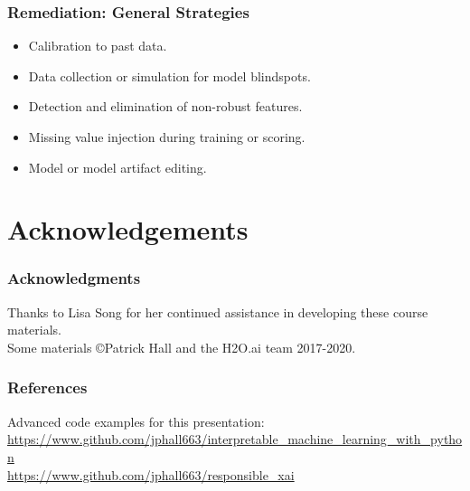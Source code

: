 \documentclass[11pt,
               aspectratio=169,
               hyperref={colorlinks}
               ]{beamer}
\begin{document}
			\begin{frame}
		
				\frametitle{\textbf{Remediation}: General Strategies}

				\begin{itemize}
					\item Calibration to past data.
					\item Data collection or simulation for model blindspots.
					\item Detection and elimination of non-robust features.
					\item Missing value injection during training or scoring.
					\item Model or model artifact editing.
				\end{itemize}				
				
			\end{frame}



	\section{Acknowledgements} 

		\begin{frame}
			
			\frametitle{Acknowledgments}
			
				Thanks to Lisa Song for her continued assistance in developing these course materials.\\
				\vspace{10pt}
				Some materials \copyright\hspace{1pt}Patrick Hall and the H2O.ai team 2017-2020.  
			
		\end{frame}	

		\begin{frame}[t, allowframebreaks]
	
			\frametitle{References}	

			Advanced code examples for this presentation:\\
			\small{\url{https://www.github.com/jphall663/interpretable_machine_learning_with_python}}\\
			\noindent \small{\url{https://www.github.com/jphall663/responsible_xai}}
								
		\framebreak		
		
		\printbibliography
		
	\end{frame}
\end{document}
